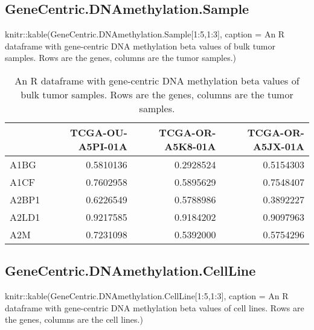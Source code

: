 \documentclass[]{article}
\newcommand{\hlnum}[1]{\textcolor[rgb]{0.816,0.125,0.439}{#1}}%
\newcommand{\hlstr}[1]{\textcolor[rgb]{0.251,0.627,0.251}{#1}}%
\newcommand{\hlstd}[1]{\textcolor[rgb]{0.251,0.251,0.251}{#1}}%
\newenvironment{Shaded}{\begin{myshaded}}{\end{myshaded}}
\newcommand{\DecValTok}[1]{\hlnum{#1}}
\newcommand{\SpecialCharTok}[1]{\hlstr{#1}}
\newcommand{\StringTok}[1]{\hlstr{#1}}
\newcommand{\FunctionTok}[1]{\hlstd{#1}}
\newcommand{\AttributeTok}[1]{{#1}}
\newcommand{\NormalTok}[1]{\hlstd{#1}}
\begin{document}
\hypertarget{genecentric.dnamethylation.sample}{%
\subsection{\texorpdfstring{ GeneCentric.DNAmethylation.Sample}{  GeneCentric.DNAmethylation.Sample}}\label{genecentric.dnamethylation.sample}}

\begin{Shaded}
\begin{Highlighting}[]
\NormalTok{knitr}\SpecialCharTok{::}\FunctionTok{kable}\NormalTok{(GeneCentric.DNAmethylation.Sample[}\DecValTok{1}\SpecialCharTok{:}\DecValTok{5}\NormalTok{,}\DecValTok{1}\SpecialCharTok{:}\DecValTok{3}\NormalTok{], }\AttributeTok{caption =} \StringTok{\textquotesingle{}An R dataframe with gene{-}centric DNA methylation beta values of bulk tumor samples. Rows are the genes, columns are the tumor samples.\textquotesingle{}}\NormalTok{)}
\end{Highlighting}
\end{Shaded}

\begin{table}

\caption{\label{tab:unnamed-chunk-66}An R dataframe with gene-centric DNA methylation beta values of bulk tumor samples. Rows are the genes, columns are the tumor samples.}
\centering
\begin{tabular}[t]{l|r|r|r}
\hline
  & TCGA-OU-A5PI-01A & TCGA-OR-A5K8-01A & TCGA-OR-A5JX-01A\\
\hline
A1BG & 0.5810136 & 0.2928524 & 0.5154303\\
\hline
A1CF & 0.7602958 & 0.5895629 & 0.7548407\\
\hline
A2BP1 & 0.6226549 & 0.5788986 & 0.3892227\\
\hline
A2LD1 & 0.9217585 & 0.9184202 & 0.9097963\\
\hline
A2M & 0.7231098 & 0.5392000 & 0.5754296\\
\hline
\end{tabular}
\end{table}

\hypertarget{genecentric.dnamethylation.cellline}{%
\subsection{\texorpdfstring{ GeneCentric.DNAmethylation.CellLine}{  GeneCentric.DNAmethylation.CellLine}}\label{genecentric.dnamethylation.cellline}}

\begin{Shaded}
\begin{Highlighting}[]
\NormalTok{knitr}\SpecialCharTok{::}\FunctionTok{kable}\NormalTok{(GeneCentric.DNAmethylation.CellLine[}\DecValTok{1}\SpecialCharTok{:}\DecValTok{5}\NormalTok{,}\DecValTok{1}\SpecialCharTok{:}\DecValTok{3}\NormalTok{], }\AttributeTok{caption =} \StringTok{\textquotesingle{}An R dataframe with gene{-}centric DNA methylation beta values of cell lines. Rows are the genes, columns are the cell lines.\textquotesingle{}}\NormalTok{)}
\end{Highlighting}
\end{Shaded}
\end{document}
